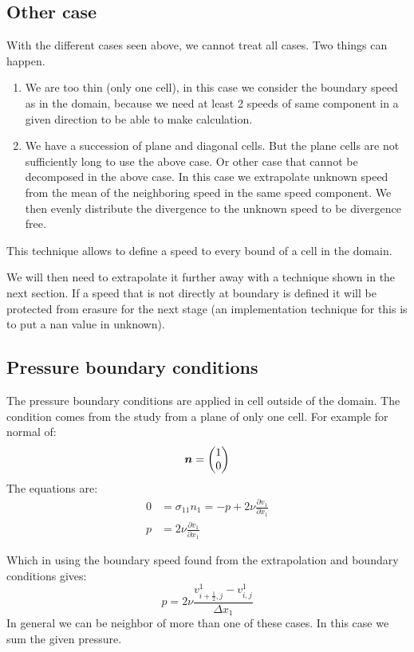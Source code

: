 \subsection{Other case}
With the different cases seen above, we cannot treat all cases. Two things can happen.
\begin{enumerate}
	\item We are too thin (only one cell), in this case we consider the boundary speed as in the domain,
	because we need at least 2 speeds of same component in a given direction to be able to make calculation.
	\item We have a succession of plane and diagonal cells. But the plane cells are not sufficiently long to use the above case.
	Or other case that cannot be decomposed in the above case.
	In this case we extrapolate unknown speed from the mean of the neighboring speed in the same speed component.
	We then evenly distribute the divergence to the unknown speed to be divergence free.
\end{enumerate}
This technique allows to define a speed to every bound of a cell in the domain.

We will then need to extrapolate it further away with a technique shown in the next section.
If a speed that is not directly at boundary is defined it will be protected from erasure for the next stage (an implementation technique for this
is to put a nan value in unknown).

\subsection{Pressure boundary conditions}

The pressure boundary conditions are applied in cell outside of the domain.
The condition comes from the study from a plane of only one cell.
For example for normal of:
\begin{equation}
	{\boldsymbol {n}}=\begin{pmatrix}
			1\\
			0
		\end{pmatrix}
\end{equation}
The equations are:
\begin{align}
	0&=\sigma_{11}n_{1}=-p+2\nu\frac{\partial v_{1}}{\partial x_{1}}\\
	p&=2\nu\frac{\partial v_{1}}{\partial x_{1}}
\end{align}

Which in using the boundary speed found from the extrapolation and boundary conditions gives:
\begin{equation}
	p=2\nu\frac{v^{1}_{i+\frac{1}{2},j}-v^{1}_{i,j}}{\Delta x_{1}}
\end{equation}
In general we can be neighbor of more than one of these cases.
In this case we sum the given pressure.

